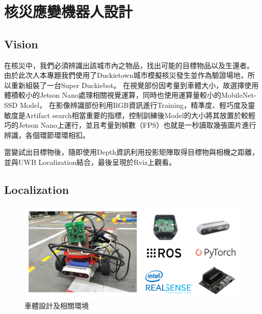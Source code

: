 \section{核災應變機器人設計}

\subsection{Vision}
在核災中，我們必須辨識出該城市內之物品，找出可能的目標物品以及生還者。
由於此次人本專題我們使用了Duckietown城市模擬核災發生並作為驗證場地，所以重新組裝了一台Super Duckiebot。
在視覺部份因考量到車體大小，故選擇使用體積較小的Jetson Nano處理相關視覺運算，同時也使用運算量較小的MobileNet-SSD Model，
在影像辨識部份利用RGB資訊進行Training，精準度、輕巧度及靈敏度是Artifact search相當重要的指標，控制訓練後Model的大小將其放置於較輕巧的Jetson Nano上運行，並且考量到幀數（FPS）也就是一秒讀取幾張圖片進行辨識，各個環節環環相扣。

當變試出目標物後，隨即使用Depth資訊利用投影矩陣取得目標物與相機之距離，並與UWB Localization結合，最後呈現於Rviz上觀看。



\subsection{Localization}


\begin{figure}[t]
  \centering
    \includegraphics[width=\columnwidth]{images/car.png}
        \caption{車體設計及相關環境}
 \label{figure:car}
\end{figure}









